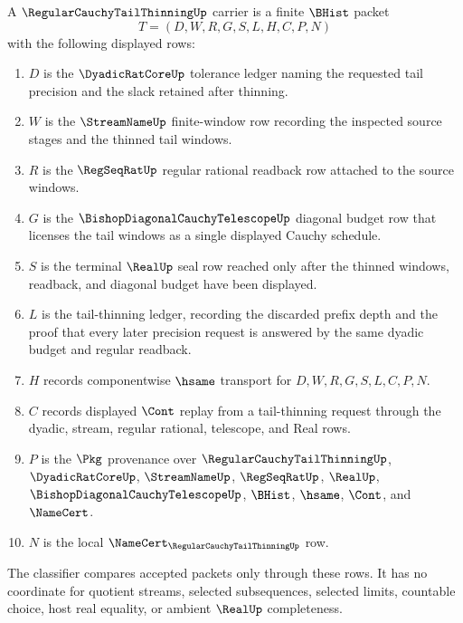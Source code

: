 \begin{definition}
\label{def:regular-cauchy-tail-thinning-carrier}
A $\RegularCauchyTailThinningUp$ carrier is a finite $\BHist$ packet
$$
T=(D,W,R,G,S,L,H,C,P,N)
$$
with the following displayed rows:
\begin{enumerate}
\item $D$ is the $\DyadicRatCoreUp$ tolerance ledger naming the requested tail precision and the slack retained after thinning.
\item $W$ is the $\StreamNameUp$ finite-window row recording the inspected source stages and the thinned tail windows.
\item $R$ is the $\RegSeqRatUp$ regular rational readback row attached to the source windows.
\item $G$ is the $\BishopDiagonalCauchyTelescopeUp$ diagonal budget row that licenses the tail windows as a single displayed Cauchy schedule.
\item $S$ is the terminal $\RealUp$ seal row reached only after the thinned windows, readback, and diagonal budget have been displayed.
\item $L$ is the tail-thinning ledger, recording the discarded prefix depth and the proof that every later precision request is answered by the same dyadic budget and regular readback.
\item $H$ records componentwise $\hsame$ transport for $D,W,R,G,S,L,C,P,N$.
\item $C$ records displayed $\Cont$ replay from a tail-thinning request through the dyadic, stream, regular rational, telescope, and Real rows.
\item $P$ is the $\Pkg$ provenance over $\RegularCauchyTailThinningUp$, $\DyadicRatCoreUp$, $\StreamNameUp$, $\RegSeqRatUp$, $\RealUp$, $\BishopDiagonalCauchyTelescopeUp$, $\BHist$, $\hsame$, $\Cont$, and $\NameCert$.
\item $N$ is the local $\NameCert_{\RegularCauchyTailThinningUp}$ row.
\end{enumerate}
The classifier compares accepted packets only through these rows. It has no coordinate for quotient streams, selected subsequences, selected limits, countable choice, host real equality, or ambient $\RealUp$ completeness.
\end{definition}


